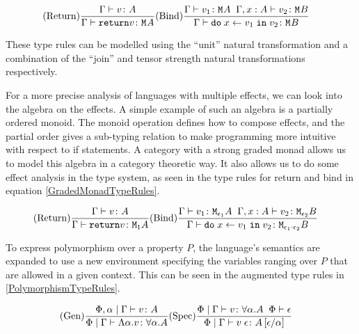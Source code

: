 \documentclass{Report}
\begin{document}
\begin{eqnarray}\label{MonadTypeRules}
    (\text{Return}) \frac{\Gamma \vdash v \colon A}{\Gamma \vdash \texttt{return} v \colon \texttt{M}_{}{A}} & (\text{Bind}) \frac{\Gamma \vdash v_1 \colon \texttt{M}_{}{A} \;\; \Gamma, x: A \vdash v_2 \colon \texttt{M}_{}{B}}{\Gamma \vdash \texttt{do}\; x \leftarrow v_1 \;\texttt{in}\; v_2 \colon \texttt{M}_{}{B}}
\end{eqnarray}

These type rules can be modelled using the ``unit'' natural transformation and a combination of the ``join'' and tensor strength natural transformations respectively. 

For a more precise analysis of languages with multiple effects, we can look into the algebra on the effects. A simple example of such an algebra is a partially ordered monoid. The monoid operation defines how to compose effects, and the partial order gives a sub-typing relation to make programming more intuitive with respect to if statements. A category with a strong graded monad allows us to model this algebra in a category theoretic way. It also allows us to do some effect analysis in the type system, as seen in the type rules for return and bind in equation \ref{GradedMonadTypeRules}.


\begin{eqnarray}\label{GradedMonadTypeRules}
    (\text{Return}) \frac{\Gamma \vdash v \colon A}{\Gamma \vdash \texttt{return} v \colon \texttt{M}_{\texttt{1}}{A}} & (\text{Bind}) \frac{\Gamma \vdash v_1 \colon \texttt{M}_{\epsilon_1}{A} \;\; \Gamma, x: A \vdash v_2 \colon \texttt{M}_{\epsilon_2}{B}}{\Gamma \vdash \texttt{do}\; x \leftarrow v_1 \;\texttt{in}\; v_2 \colon \texttt{M}_{\epsilon_1 \cdot \epsilon_2}{B}}
\end{eqnarray}


To express polymorphism over a property $P$, the language's semantics are expanded to use a new environment specifying the variables ranging over $P$ that are allowed in a given context. This can be seen in the augmented type rules in \ref{PolymorphismTypeRules}.

\begin{eqnarray}\label{PolymorphismTypeRules}
    (\text{Gen}) \frac{\Phi, \alpha\mid\Gamma \vdash v \colon A}{\Phi\mid\Gamma \vdash \Lambda \alpha. v \colon \forall \alpha. A}& (\text{Spec}) \frac{\Phi\mid\Gamma \vdash v \colon \forall \alpha. A\;\;\Phi\vdash \epsilon}{\Phi\mid\Gamma \vdash v\;\epsilon \colon A\left[\epsilon / \alpha\right]}
\end{eqnarray}
\end{document}
